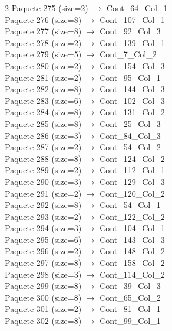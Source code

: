 \begin{multicols}{2}
Paquete 275 (size=2) $\rightarrow$ Cont\_64\_Col\_1\\
Paquete 276 (size=8) $\rightarrow$ Cont\_107\_Col\_1\\
Paquete 277 (size=8) $\rightarrow$ Cont\_92\_Col\_3\\
Paquete 278 (size=2) $\rightarrow$ Cont\_139\_Col\_1\\
Paquete 279 (size=5) $\rightarrow$ Cont\_7\_Col\_2\\
Paquete 280 (size=2) $\rightarrow$ Cont\_154\_Col\_3\\
Paquete 281 (size=2) $\rightarrow$ Cont\_95\_Col\_1\\
Paquete 282 (size=8) $\rightarrow$ Cont\_144\_Col\_3\\
Paquete 283 (size=6) $\rightarrow$ Cont\_102\_Col\_3\\
Paquete 284 (size=8) $\rightarrow$ Cont\_131\_Col\_2\\
Paquete 285 (size=8) $\rightarrow$ Cont\_25\_Col\_3\\
Paquete 286 (size=3) $\rightarrow$ Cont\_84\_Col\_3\\
Paquete 287 (size=2) $\rightarrow$ Cont\_54\_Col\_2\\
Paquete 288 (size=8) $\rightarrow$ Cont\_124\_Col\_2\\
Paquete 289 (size=2) $\rightarrow$ Cont\_112\_Col\_1\\
Paquete 290 (size=3) $\rightarrow$ Cont\_129\_Col\_3\\
Paquete 291 (size=2) $\rightarrow$ Cont\_120\_Col\_2\\
Paquete 292 (size=8) $\rightarrow$ Cont\_54\_Col\_1\\
Paquete 293 (size=2) $\rightarrow$ Cont\_122\_Col\_2\\
Paquete 294 (size=3) $\rightarrow$ Cont\_104\_Col\_1\\
Paquete 295 (size=6) $\rightarrow$ Cont\_143\_Col\_3\\
Paquete 296 (size=2) $\rightarrow$ Cont\_148\_Col\_2\\
Paquete 297 (size=8) $\rightarrow$ Cont\_158\_Col\_2\\
Paquete 298 (size=3) $\rightarrow$ Cont\_114\_Col\_2\\
Paquete 299 (size=8) $\rightarrow$ Cont\_39\_Col\_3\\
Paquete 300 (size=8) $\rightarrow$ Cont\_65\_Col\_2\\
Paquete 301 (size=2) $\rightarrow$ Cont\_81\_Col\_1\\
Paquete 302 (size=8) $\rightarrow$ Cont\_99\_Col\_1\\

\end{multicols}
